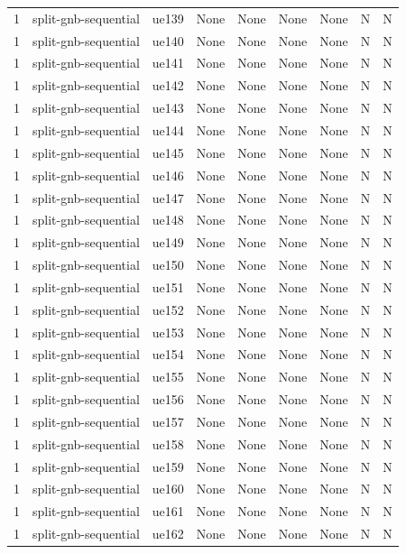 \begin{table}[ht]
\begin{tabular}{|c|c|c|c|c|c|c|c|c|}
1 & split-gnb-sequential & ue139 & None & None & None & None & N & N \\
1 & split-gnb-sequential & ue140 & None & None & None & None & N & N \\
1 & split-gnb-sequential & ue141 & None & None & None & None & N & N \\
1 & split-gnb-sequential & ue142 & None & None & None & None & N & N \\
1 & split-gnb-sequential & ue143 & None & None & None & None & N & N \\
1 & split-gnb-sequential & ue144 & None & None & None & None & N & N \\
1 & split-gnb-sequential & ue145 & None & None & None & None & N & N \\
1 & split-gnb-sequential & ue146 & None & None & None & None & N & N \\
1 & split-gnb-sequential & ue147 & None & None & None & None & N & N \\
1 & split-gnb-sequential & ue148 & None & None & None & None & N & N \\
1 & split-gnb-sequential & ue149 & None & None & None & None & N & N \\
1 & split-gnb-sequential & ue150 & None & None & None & None & N & N \\
1 & split-gnb-sequential & ue151 & None & None & None & None & N & N \\
1 & split-gnb-sequential & ue152 & None & None & None & None & N & N \\
1 & split-gnb-sequential & ue153 & None & None & None & None & N & N \\
1 & split-gnb-sequential & ue154 & None & None & None & None & N & N \\
1 & split-gnb-sequential & ue155 & None & None & None & None & N & N \\
1 & split-gnb-sequential & ue156 & None & None & None & None & N & N \\
1 & split-gnb-sequential & ue157 & None & None & None & None & N & N \\
1 & split-gnb-sequential & ue158 & None & None & None & None & N & N \\
1 & split-gnb-sequential & ue159 & None & None & None & None & N & N \\
1 & split-gnb-sequential & ue160 & None & None & None & None & N & N \\
1 & split-gnb-sequential & ue161 & None & None & None & None & N & N \\
1 & split-gnb-sequential & ue162 & None & None & None & None & N & N \\

\end{tabular}
\end{table}

